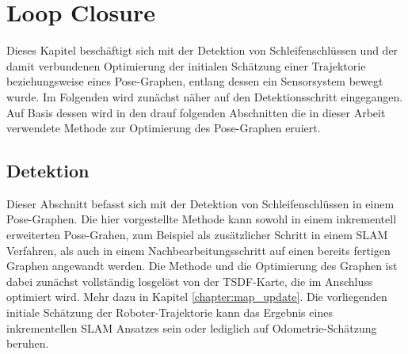 \chapter{Loop Closure}
\label{chapter:loop_closure}

Dieses Kapitel beschäftigt sich mit der Detektion von Schleifenschlüssen und der damit verbundenen Optimierung der initialen Schätzung einer Trajektorie beziehungsweise eines Pose-Graphen, entlang dessen ein Sensorsystem bewegt wurde. Im Folgenden wird zunächst näher auf den Detektionsschritt eingegangen. Auf Basis dessen wird in den drauf folgenden Abschnitten die in dieser Arbeit verwendete Methode zur Optimierung des Pose-Graphen eruiert.

\section{Detektion}

Dieser Abschnitt befasst sich mit der Detektion von Schleifenschlüssen in einem Pose-Graphen. Die hier vorgestellte Methode kann sowohl in einem inkrementell erweiterten Pose-Grahen, zum Beispiel als zusätzlicher Schritt in einem SLAM Verfahren, als auch in einem Nachbearbeitungsschritt auf einen bereits fertigen Graphen angewandt werden. Die Methode und die Optimierung des Graphen ist dabei zunächst vollständig losgelöst von der TSDF-Karte, die im Anschluss optimiert wird. Mehr dazu in Kapitel \ref{chapter:map_update}. Die vorliegenden initiale Schätzung der Roboter-Trajektorie kann das Ergebnis eines inkrementellen SLAM Ansatzes sein oder lediglich auf Odometrie-Schätzung beruhen.

